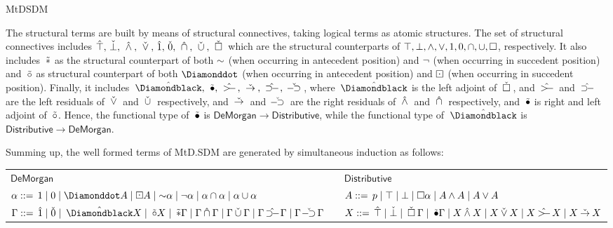 \begin{entry}{MtDSDM}
\begin{clarifications}
  The structural terms are built by means of structural connectives, taking
  logical terms as atomic structures. The set of structural connectives includes
  $\hat{\top},\, \check{\bot},\, \:\hat{\wedge}\:,\, \:\check{\vee}\:,\, \hat{1},\, \check{0}, \, \:\hat{\cap}\:,\, \:\check{\cup}\:,\,  \:\check{\Box}\: $
  which are the structural counterparts of $\top, \bot,  \wedge, \vee,   1,
  0,    \cap, \cup, \Box$, respectively.  It also includes $\:\tilde{*}$ as the
  structural counterpart of both ${\sim}$ (when occurring in antecedent position)
  and $\neg$ (when occurring in succedent position) and $\:\tilde{{\circ}}$ as structural
  counterpart of both $\wdia$ (when occurring in antecedent position) and $\boxdot$
  (when occurring in succedent position). Finally, it includes  $\BDIA,\, \BCIR,\,
  \XCRARR,\, \XRARR,\, \DCRARR ,\, \DRARR $, where $\BDIA$ is the left adjoint of
  $\:\check{\Box}\:$, and $\XCRARR$ and $\DCRARR$ are the left  residuals of $\:\check{\vee}\:$ and
  $\:\check{\cup}\:$ respectively, and $\:\check{\rightarrow}\:$ and $\DRARR$ are the right residuals of
  $\:\hat{\wedge}\:$ and $\:\hat{\cap}\:$ respectively, and $\:\tilde{{\bullet}}$ is right and left adjoint of
  $\:\tilde{{\circ}}$. Hence, the functional type of $\:\tilde{{\bullet}}$ is  $\mathsf{De
  Morgan}\rightarrow \mathsf{Distributive}$, while the functional type of  $\BDIA$
  is $\mathsf{Distributive}\rightarrow \mathsf{De Morgan}$.
  
  Summing up, the well formed terms of MtD.SDM are generated by simultaneous
  induction as follows:
  \begin{center}
  {\small
  \setlength{\tabcolsep}{0.4em}
  \begin{tabular}{@{}lcl@{}}
  $\mathsf{De Morgan}$ &  & $\mathsf{Distributive}$\\
  $\alpha ::=  \,\dtop  \mid \dbot \mid \wdia A \mid \bbox A 
              \mid \dneg\alpha \mid \rdneg\alpha \mid \alpha \dand \alpha 
              \mid \alpha \dor \alpha$ & & $A ::= \,p \mid \top \mid \bot 
              \mid \Box \alpha  \mid A \wedge A \mid A \vee A$ \\
  $\Gamma ::= \, \DTOP  \mid \DBOT \mid \BDIA X \mid \WCIR X \mid \DNEG \Gamma 
              \mid \Gamma \DAND \Gamma  \mid \Gamma \DOR \Gamma \mid \Gamma \DCRARR \Gamma  
              \mid \Gamma \DRARR \Gamma$ & & $X ::= \,\XTOP \mid \XBOT \mid \WBOX\Gamma 
              \mid \BCIR\Gamma \mid  X \XAND X  \mid X \XOR X \mid X \XCRARR X \mid X \XRARR X$ \\
  \end{tabular}
  }
  \end{center}
  

\end{clarifications}
\end{entry}
